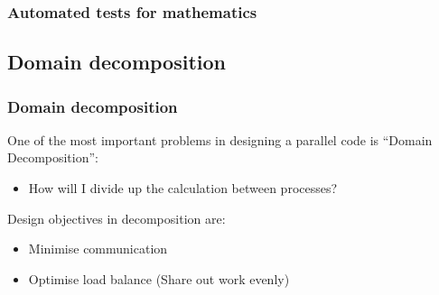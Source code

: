 \subsubsection{Automated tests for
mathematics}\label{automated-tests-for-mathematics}

\begin{Shaded}
\begin{Highlighting}[]

  \NormalTok{) \{}
     \NormalTok{);}
    \NormalTok{,}\NormalTok{,}\NormalTok{) == }\NormalTok{);}
    \NormalTok{,}\NormalTok{,}\NormalTok{);}
    \NormalTok{,}\NormalTok{,}\NormalTok{) == }\NormalTok{);}
    \NormalTok{,}\NormalTok{,}\NormalTok{)) < }\NormalTok{);}
  \NormalTok{\}}
\end{Highlighting}
\end{Shaded}

\subsection{Domain decomposition}\label{domain-decomposition}

\subsubsection{Domain decomposition}\label{domain-decomposition-1}

One of the most important problems in designing a parallel code is
``Domain Decomposition'':

\begin{itemize}
\itemsep1pt\parskip0pt
\item
  How will I divide up the calculation between processes?
\end{itemize}

Design objectives in decomposition are:

\begin{itemize}
\itemsep1pt\parskip0pt
\item
  Minimise communication
\item
  Optimise load balance (Share out work evenly)
\end{itemize}

